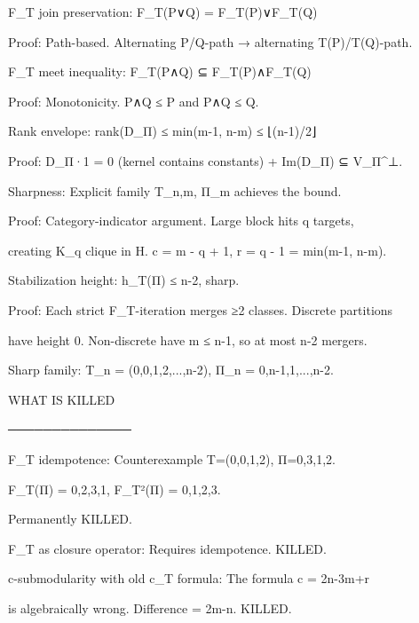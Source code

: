 F_T join preservation: F_T(P∨Q) = F_T(P)∨F_T(Q)

Proof: Path-based. Alternating P/Q-path → alternating T(P)/T(Q)-path.






F_T meet inequality: F_T(P∧Q) ⊆ F_T(P)∧F_T(Q)

Proof: Monotonicity. P∧Q ≤ P and P∧Q ≤ Q.






Rank envelope: rank(D_Π) ≤ min(m-1, n-m) ≤ ⌊(n-1)/2⌋

Proof: D_Π·1 = 0 (kernel contains constants) + Im(D_Π) ⊆ V_Π^⊥.






Sharpness: Explicit family T_{n,m}, Π_m achieves the bound.

Proof: Category-indicator argument. Large block hits q targets,

creating K_q clique in H. c = m - q + 1, r = q - 1 = min(m-1, n-m).






Stabilization height: h_T(Π) ≤ n-2, sharp.

Proof: Each strict F_T-iteration merges ≥2 classes. Discrete partitions

have height 0. Non-discrete have m ≤ n-1, so at most n-2 mergers.

Sharp family: T_n = (0,0,1,2,...,n-2), Π_n = {{0,n-1},{1},...,{n-2}}.






WHAT IS KILLED

──────────────






F_T idempotence: Counterexample T=(0,0,1,2), Π={{0,3},{1},{2}}.

F_T(Π) = {{0,2,3},{1}}, F_T²(Π) = {{0,1,2,3}}.

Permanently KILLED.






F_T as closure operator: Requires idempotence. KILLED.






c-submodularity with old c_T formula: The formula c = 2n-3m+r

is algebraically wrong. Difference = 2m-n. KILLED.






